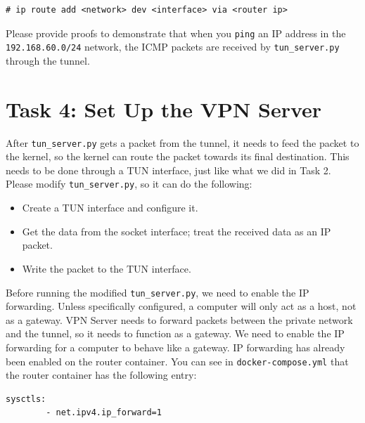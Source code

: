 \begin{lstlisting}
# ip route add <network> dev <interface> via <router ip>
\end{lstlisting}
 

Please provide proofs to demonstrate that when you \texttt{ping}
an IP address in the \texttt{192.168.60.0/24} network, the ICMP packets 
are received by \texttt{tun\_server.py} through the tunnel. 
 



\section{Task 4: Set Up the VPN Server}


After \texttt{tun\_server.py} gets a packet from the 
tunnel, it needs to feed the packet to the kernel, so
the kernel can route the packet towards its final destination. 
This needs to be done through a TUN interface, just like what 
we did in Task 2. Please modify \texttt{tun\_server.py}, so it 
can do the following: 


\begin{itemize}[noitemsep]
\item Create a TUN interface and configure it.

\item Get the data from the socket interface; treat the received data 
as an IP packet.

\item Write the packet to the TUN interface.

\end{itemize}
 

Before running the modified \texttt{tun\_server.py}, we need to enable the 
IP forwarding. 
Unless specifically configured, a computer will only act as a host, 
not as a gateway. VPN Server needs to forward packets between the private network and the 
tunnel, so it needs to function as a gateway. We need to  
enable the IP forwarding for a computer to behave like a gateway. 
IP forwarding has already been enabled on the router container. 
You can see in \texttt{docker-compose.yml} that the router
container has the following entry:

\begin{lstlisting}
sysctls:
        - net.ipv4.ip_forward=1
\end{lstlisting}


